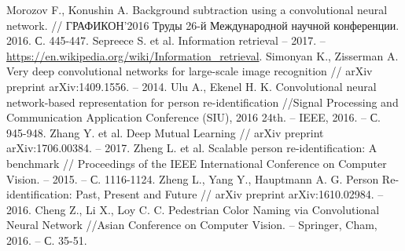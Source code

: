 \documentclass[a4paper]{article}
\begin{document}
\begin{multicols*}{2}
\begin{thebibliography}{1}
   Morozov F., Konushin A. Background subtraction using a convolutional neural network. // ГРАФИКОН'2016 Труды 26-й Международной научной конференции. 2016. С. 445-447.
   Sepreece S. et al. Information retrieval -- 2017. -- \url{https://en.wikipedia.org/wiki/Information\_retrieval}.
   Simonyan K., Zisserman A. Very deep convolutional networks for large-scale image recognition // arXiv preprint arXiv:1409.1556. -- 2014.
   Ulu A., Ekenel H. K. Convolutional neural network-based representation for person re-identification //Signal Processing and Communication Application Conference (SIU), 2016 24th. -- IEEE, 2016. -- С. 945-948.
   Zhang Y. et al. Deep Mutual Learning // arXiv preprint arXiv:1706.00384. – 2017.
   Zheng L. et al. Scalable person re-identification: A benchmark // Proceedings of the IEEE International Conference on Computer Vision. -- 2015. -- С. 1116-1124.
   Zheng L., Yang Y., Hauptmann A. G. Person Re-identification: Past, Present and Future // arXiv preprint arXiv:1610.02984. – 2016.
   Cheng Z., Li X., Loy C. C. Pedestrian Color Naming via Convolutional Neural Network //Asian Conference on Computer Vision. -- Springer, Cham, 2016. -- С. 35-51.
\end{thebibliography}


\end{multicols*}
\end{document}
